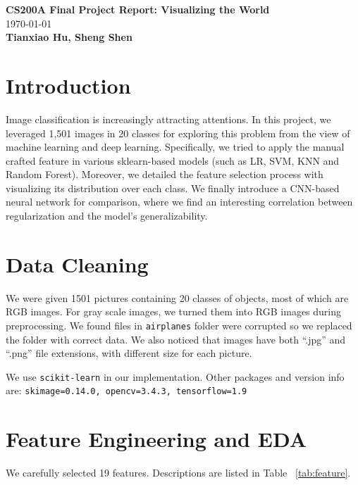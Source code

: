 \documentclass[a4paper, 11pt]{article}
\begin{document}

\begin{center}
    \Large{\textbf{CS200A Final Project Report: Visualizing the World}} \\
    \vspace{0.7cm}
    \large{\today} \\
    \vspace{0.3cm}
    \large{\textbf{Tianxiao Hu, Sheng Shen}}
\end{center}


\section*{Introduction}
Image classification is increasingly attracting
attentions. In this project, we leveraged 1,501 images in 20 classes for exploring this problem from the view of machine learning and deep learning. Specifically, we tried to apply the manual crafted feature in various sklearn-based models (such as LR, SVM, KNN and Random Forest). Moreover, we detailed the feature selection process with visualizing its distribution over each class. We finally introduce a CNN-based neural network for comparison, where we find an interesting correlation between regularization and the model's generalizability.

\section*{Data Cleaning}
We were given 1501 pictures containing 20 classes of objects, most of which are RGB images. For gray scale images, we turned them into RGB images during preprocessing. We found files in \texttt{airplanes} folder were corrupted so we replaced the folder with correct data. We also noticed that images have both ``.jpg'' and ``.png'' file extensions, with different size for each picture.

We use \texttt{scikit-learn} \cite{scikit-learn} in our implementation. Other packages and version info are: \texttt{skimage=0.14.0, opencv=3.4.3, tensorflow=1.9}

\section*{Feature Engineering and EDA}
We carefully selected 19 features. Descriptions are listed in Table ~\ref{tab:feature}.
\end{document}
